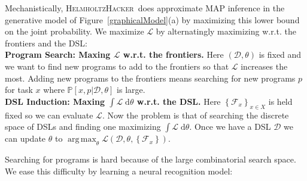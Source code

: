 \documentclass{article}
\newcommand{\system}{\textsc{HelmholtzHacker}~}
\newcommand{\lowerBound}{\mathscr{L}}
\DeclareMathOperator*{\argmax}{arg\,max} %
\newcommand{\probability}{\mathds{P}} %
\begin{document}


Mechanistically, \system does approximate MAP inference in the generative model of Figure~\ref{graphicalModel}(a) by maximizing this lower bound on the joint probability.
We maximize $\lowerBound$ by alternatingly maximizing w.r.t. the frontiers and the DSL:
\\\noindent \textbf{Program Search: Maxing $\lowerBound$ w.r.t. the frontiers.} Here $(\mathcal{D},\theta)$ is fixed and we
want to find new programs to add to  the frontiers so that $\lowerBound$ increases the most.
Adding new programs to the frontiers means searching for new programs $p$ for task $x$
where $\probability[x,p|\mathcal{D},\theta]$ is large.
\\\noindent \textbf{DSL Induction: Maxing $\int \lowerBound\;\mathrm{d}\theta$ w.r.t. the DSL.} Here $\left\{\mathcal{F}_x \right\}_{x\in X}$ is held fixed so we can evaluate $\lowerBound$. Now the problem is that of searching the discrete space of DSLs and finding one maximizing $\int \lowerBound\;\mathrm{d}\theta$.
Once we have a DSL $\mathcal{D}$ we can update $\theta$ to $\argmax_\theta \lowerBound(\mathcal{D},\theta,\left\{\mathcal{F}_x \right\})$. 


Searching for programs is hard because
of the large combinatorial search space. We ease this difficulty by learning a neural recognition model:
\end{document}
